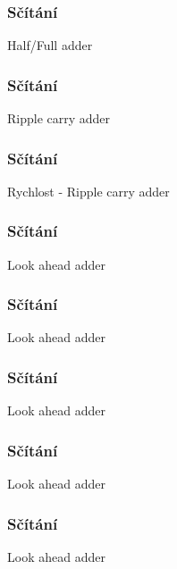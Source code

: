 \documentclass{beamer}
\begin{document}
\begin{frame}
\frametitle{Sčítání}

Half/Full adder
\end{frame}

\begin{frame}
\frametitle{Sčítání}

Ripple carry adder
\end{frame}

\begin{frame}
\frametitle{Sčítání}

Rychlost - Ripple carry adder
\end{frame}

\begin{frame}
\frametitle{Sčítání}

Look ahead adder
\end{frame}

\begin{frame}
\frametitle{Sčítání}

Look ahead adder
\end{frame}

\begin{frame}
\frametitle{Sčítání}

Look ahead adder
\end{frame}

\begin{frame}
\frametitle{Sčítání}

Look ahead adder
\end{frame}

\begin{frame}
\frametitle{Sčítání}

Look ahead adder
\end{frame}
\end{document}

